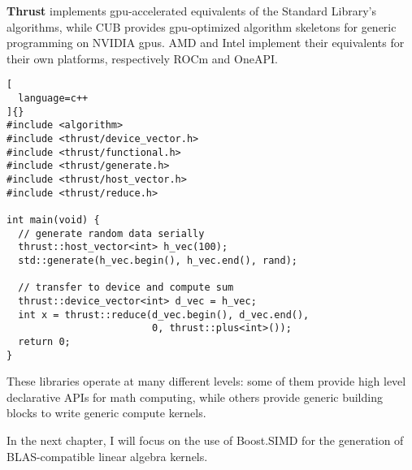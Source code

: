 \documentclass[../main]{subfiles}
\begin{document}
\begin{itemize}
\textbf{Thrust} \cite{thrust} implements \gls{gpu}-accelerated equivalents
of the Standard Library's algorithms, while CUB \cite{cub} provides
\gls{gpu}-optimized algorithm skeletons for generic programming on NVIDIA
\glspl{gpu}.
AMD and Intel implement their equivalents for their own platforms, respectively
ROCm and OneAPI.

\begin{lstlisting}[
  language=c++
]{}
#include <algorithm>
#include <thrust/device_vector.h>
#include <thrust/functional.h>
#include <thrust/generate.h>
#include <thrust/host_vector.h>
#include <thrust/reduce.h>

int main(void) {
  // generate random data serially
  thrust::host_vector<int> h_vec(100);
  std::generate(h_vec.begin(), h_vec.end(), rand);

  // transfer to device and compute sum
  thrust::device_vector<int> d_vec = h_vec;
  int x = thrust::reduce(d_vec.begin(), d_vec.end(),
                         0, thrust::plus<int>());
  return 0;
}
\end{lstlisting}

\end{itemize}

These libraries operate at many different levels: some of them provide
high level declarative APIs for math computing, while others provide generic
building blocks to write generic compute kernels.

In the next chapter, I will focus on the use of Boost.SIMD \cite{bsimd}
for the generation of BLAS-compatible linear algebra kernels.
\end{document}
